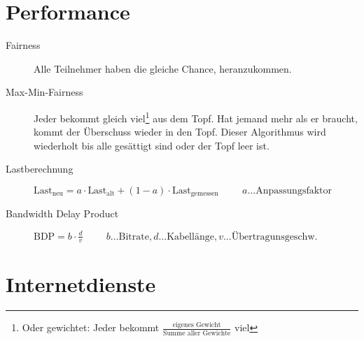 \documentclass[a4paper]{article}
\newcommand{\hs}[1]{\hspace{#1}}
\begin{document}
\section{Performance}

\begin{description}
    \item[Fairness] Alle Teilnehmer haben die gleiche Chance, heranzukommen.
    \item[Max-Min-Fairness] Jeder bekommt gleich viel\footnote{Oder gewichtet: Jeder bekommt $\frac{\text{eigenes Gewicht}}{\text{Summe aller Gewichte}}$ viel} aus dem Topf. Hat jemand mehr als er braucht, kommt der Überschuss wieder in den Topf. Dieser Algorithmus wird wiederholt bis alle gesättigt sind oder der Topf leer ist.
    \item[Lastberechnung] $\text{Last}_{\text{neu}} = a \cdot \text{Last}_{\text{alt}} + (1 - a) \cdot \text{Last}_{\text{gemessen}} \hs{1cm} a \ldots \text{Anpassungsfaktor}$
    \item[Bandwidth Delay Product] $\text{BDP} = b \cdot \frac{d}{v} \hs{1cm} b \ldots \text{Bitrate}, d \ldots \text{Kabellänge}, v \ldots \text{Übertragunsgeschw.}$
\end{description}

\section{Internetdienste}
\end{document}
